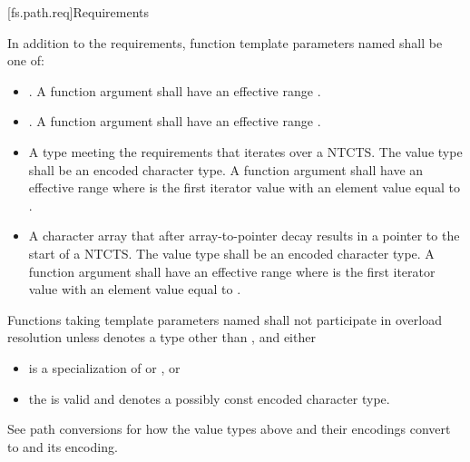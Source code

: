 [fs.path.req]{Requirements}

\pnum
In addition to the requirements,
function template parameters named 
shall be one of:
\begin{itemize}
\item {}. A function
  argument   shall have an
  effective range .
\item {}. A function
  argument   shall have an
  effective range .
\item A type meeting the  requirements that iterates over a NTCTS\@.
  The value type shall be an encoded character type. A function argument
    shall have an effective range
   where  is the first
  iterator value with an element value equal to
  .
\item A character array that after array-to-pointer decay results in a
  pointer to the start of a NTCTS\@. The value type shall be an encoded character type. A
  function argument   shall
  have an effective range  where
   is the first iterator value with an element value equal to
  .
\end{itemize}

\pnum
Functions taking template parameters named 
shall not participate in overload resolution unless
 denotes a type other than , and
either
\begin{itemize}
\item
{} is a specialization of
 or , or
\item
the   is valid and
denotes a possibly const encoded character type.
\end{itemize}

\pnum
\begin{note}
See path conversions
for how the value types above and their encodings convert to
 and its encoding.
\end{note}

